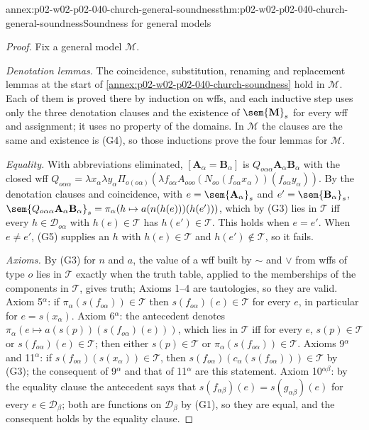 \begin{annexitem}{annex:p02-w02-p02-040-church-general-soundness}{thm:p02-w02-p02-040-church-general-soundness}{Soundness for general models}
\begin{proof}
Fix a general model \(\mathcal M\).

\emph{Denotation lemmas.}  The coincidence, substitution, renaming and
replacement lemmas at the start of
\cref{annex:p02-w02-p02-040-church-soundness} hold in \(\mathcal M\).  Each of
them is proved there by induction on wffs, and each inductive step uses
only the three denotation clauses and the existence of
\(\sem{\mathbf M}_s\) for every wff and assignment; it uses no property of the
domains.  In \(\mathcal M\) the clauses are the same and existence is (G4),
so those inductions prove the four lemmas for \(\mathcal M\).

\emph{Equality.}  With abbreviations eliminated, \([\mathbf A_\alpha=\mathbf B_\alpha]\)
is \(Q_{o\alpha\alpha}\mathbf A_\alpha\mathbf B_\alpha\) with the closed wff
\(Q_{o\alpha\alpha}=\lambda x_\alpha\lambda y_\alpha\Pi_{o(o\alpha)}(\lambda f_{o\alpha}A_{ooo}(N_{oo}(f_{o\alpha}x_\alpha))(f_{o\alpha}y_\alpha))\).
By the denotation clauses and coincidence, with
\(e=\sem{\mathbf A_\alpha}_s\) and \(e'=\sem{\mathbf B_\alpha}_s\),
\(\sem{Q_{o\alpha\alpha}\mathbf A_\alpha\mathbf B_\alpha}_s=\pi_\alpha(h\mapsto a(n(h(e)))(h(e')))\),
which by (G3) lies in \(\mathcal T\) iff every \(h\in\mathcal D_{o\alpha}\) with
\(h(e)\in\mathcal T\) has \(h(e')\in\mathcal T\).  This holds when \(e=e'\).  When
\(e\neq e'\), (G5) supplies an \(h\) with \(h(e)\in\mathcal T\) and
\(h(e')\notin\mathcal T\), so it fails.

\emph{Axioms.}  By (G3) for \(n\) and \(a\), the value of a wff built by
\(\sim\) and \(\vee\) from wffs of type \(o\) lies in \(\mathcal T\) exactly when
the truth table, applied to the memberships of the components in
\(\mathcal T\), gives truth; Axioms 1--4 are tautologies, so they are valid.
Axiom 5\(^\alpha\): if \(\pi_\alpha(s(f_{o\alpha}))\in\mathcal T\) then
\(s(f_{o\alpha})(e)\in\mathcal T\) for every \(e\), in particular for
\(e=s(x_\alpha)\).  Axiom 6\(^\alpha\): the antecedent denotes
\(\pi_\alpha(e\mapsto a(s(p))(s(f_{o\alpha})(e)))\), which lies in \(\mathcal T\)
iff for every \(e\), \(s(p)\in\mathcal T\) or \(s(f_{o\alpha})(e)\in\mathcal T\);
then either \(s(p)\in\mathcal T\) or \(\pi_\alpha(s(f_{o\alpha}))\in\mathcal T\).
Axioms 9\(^\alpha\) and 11\(^\alpha\): if \(s(f_{o\alpha})(s(x_\alpha))\in\mathcal T\),
then \(s(f_{o\alpha})(c_\alpha(s(f_{o\alpha})))\in\mathcal T\) by (G3); the
consequent of 9\(^\alpha\) and that of 11\(^\alpha\) are this statement.
Axiom 10\(^{\alpha\beta}\): by the equality clause the antecedent says that
\(s(f_{\alpha\beta})(e)=s(g_{\alpha\beta})(e)\) for every \(e\in\mathcal D_\beta\);
both are functions on \(\mathcal D_\beta\) by (G1), so they are equal, and
the consequent holds by the equality clause.


\end{proof}
\end{annexitem}
